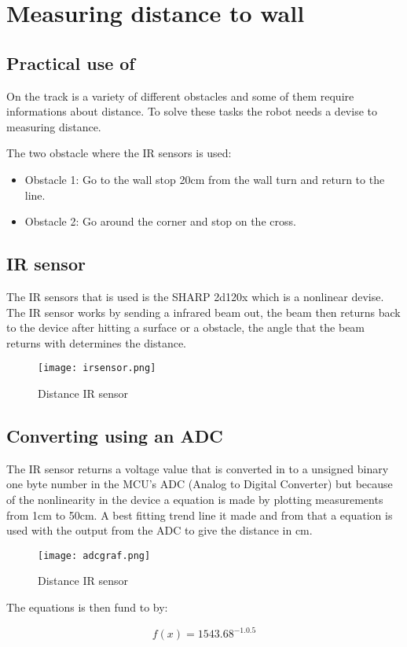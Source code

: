 \chapter{Measuring distance to wall}
\label{chap:wall_dist}

\section{Practical use of }
On the track is a variety of different obstacles and some of them require informations about distance. To solve these tasks the robot needs a devise to measuring distance. 

The two obstacle where the IR sensors is used:
\begin{itemize}
\item Obstacle 1: Go to the wall stop 20cm from the wall turn and return to the line.
\item Obstacle 2: Go around the corner and stop on the cross.
\end{itemize}

\section{IR sensor}
The IR sensors that is used is the SHARP 2d120x which is a nonlinear devise. The IR sensor works by sending a infrared beam out, the beam then returns  back to the device after hitting a surface or a obstacle, the angle that the beam returns with determines the distance. 
  \begin{figure}[!h!]
	\centering
	\texttt{[image: irsensor.png]}
	\caption{Distance IR sensor}
	\label{fig:3}
\end{figure}




\section{Converting using an ADC}
The IR sensor returns a voltage value that is converted in to a unsigned binary one byte number in the MCU's ADC (Analog to Digital Converter) but because of the nonlinearity in the device a equation is made by plotting measurements from 1cm to 50cm. A best fitting trend line it made and from that a equation is used with the output from the ADC to give the distance in cm.
  \begin{figure}[!h!]
	\centering
	\texttt{[image: adcgraf.png]}
	\caption{Distance IR sensor}
	\label{fig:3}
\end{figure}

The equations is then fund to by:

\begin{equation}
f(x) = 1543.68^{-1.0.5}
\end{equation}




